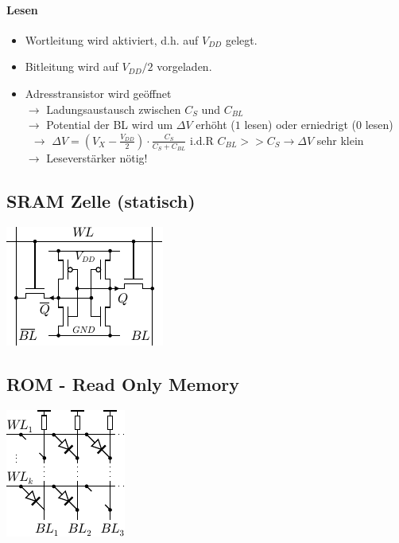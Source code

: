 \documentclass[6pt,a4paper]{scrartcl}
\newcommand{\ra}[0]{\ensuremath{\rightarrow}} 									%
\begin{document}
\begin{multicols}{3}
	\paragraph{Lesen}
	\begin{itemize}\itemsep0pt
		\item Wortleitung wird aktiviert, d.h. auf $V_{DD}$ gelegt. 
		\item Bitleitung wird auf $V_{DD} / 2$ vorgeladen.
		\item Adresstransistor wird geöffnet \\
		$\ra$ Ladungsaustausch zwischen $C_S$ und $C_{BL}$ \\
		$\ra$ Potential der BL wird um $\Delta V$ erhöht ($1$ lesen) oder erniedrigt ($0$ lesen) \\\
		$\ra$ $\Delta V = \left(V_X - \frac{V_{DD}}{2}\right) \cdot \frac{C_S}{C_S + C_{BL}}$ \quad i.d.R $C_{BL} >> C_S \ra \Delta V$ sehr klein \\
		$\ra $ Leseverstärker nötig!
	\end{itemize}

\begin{multicols}{2}	
	\subsection{SRAM Zelle (statisch)}
	\includegraphics{./img/ds/SRAM.pdf}


	\subsection{ROM - Read Only Memory}
	\includegraphics{./img/ds/ROM.pdf}
\end{multicols}


\end{multicols}
\end{document}
